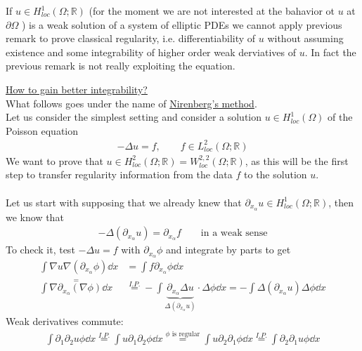 If \( u \in  H_{loc}^{1} (\Omega; \mathbb{R})  \) (for the moment we are not interested at the bahavior ot \( u \) at \( \partial \Omega \) ) is a weak solution of a system of elliptic PDEs we cannot apply previous remark to prove classical regularity, i.e. differentiability of \( u \) without assuming existence and some integrability of higher order weak derviatives of \( u \). In fact the previous remark is not really exploiting the equation.\\
\par
\underline{How to gain better integrability?}\\
What   follows goes under the name of \underline{Nirenberg's method}.\\
Let us consider the simplest setting and consider a solution \( u \in H_{loc}^{1} (\Omega)  \) of the Poisson equation
\begin{gather}
    - \Delta u = f, \qquad f \in L_{loc}^{2} (\Omega ;\mathbb{R})   
\end{gather}
We want to prove that \( u \in H_{loc}^{2} (\Omega ; \mathbb{R}) =W_{loc}^{2,2} (\Omega ;\mathbb{R})  \), as this will be the first step to transfer regularity information from the data \( f \) to the solution \( u \).\\
\\
Let us start with supposing that we already knew that \( \partial_{x_{\alpha }} u \in H_{loc}^{1} (\Omega ;\mathbb{R})  \), then we know that
\begin{gather}
    -\Delta (\partial_{x_{\alpha }} u) = \partial_{x_{\alpha }} f \qquad \text{in a weak sense}
\end{gather}
To check it, test \( -\Delta u=f \) with \( \partial_{x_{\alpha }} \phi  \) and integrate by parts to get 
\begin{align}
    \int \nabla u \nabla (\partial_{x_{\alpha }}\phi )  \dd{x} &= \int f \partial_{x_{\alpha }}\phi  \dd{x}\\
    \overset{=}{\int \nabla \partial_{x_{\alpha }}(\nabla \phi)  \dd{x}} & \overset{I.P.}{=} - \int \underbrace{\partial_{x_{\alpha }} \Delta u}_{\Delta (\partial_{x_{\alpha }} u) } \cdot \Delta \phi \dd{x} = - \int \Delta (\partial_{x_{\alpha }}u) \Delta \phi  \dd{x}
\end{align} 
Weak derivatives commute:
\begin{gather}
    \int \partial_{1}\partial_{2} u \phi  \dd{x} \overset{I.P.}{=} \int u \partial_{1} \partial_{2} \phi  \dd{x} \overset{\phi \text{ is regular}}{=} \int u \partial_{2}\partial_{1} \phi \dd{x} \overset{I.P.}{=} \int \partial_{2}\partial_{1}u \phi \dd{x}
\end{gather}
